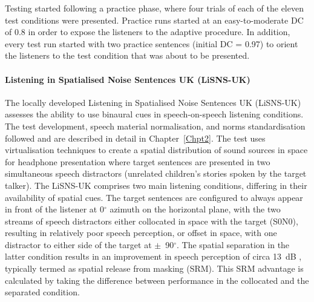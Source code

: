 \documentclass[a4paper, twoside]{templates/ociamthesis}
\begin{document}
Testing started following a practice phase, where four trials of each of the eleven test conditions were presented. Practice runs started at an easy-to-moderate DC of 0.8 in order to expose the listeners to the adaptive procedure. In addition, every test run started with two practice sentences (initial DC = 0.97) to orient the listeners to the test condition that was about to be presented.\\

\hypertarget{listening-in-spatialised-noise-sentences-uk-lisns-uk}{%
\paragraph{Listening in Spatialised Noise Sentences UK (LiSNS-UK)}\label{listening-in-spatialised-noise-sentences-uk-lisns-uk}}

\hfill\break
The locally developed Listening in Spatialised Noise Sentences UK (LiSNS-UK) assesses the ability to use binaural cues in speech-on-speech listening conditions. The test development, speech material normalisation, and norms standardisation followed \textcite{Cameron2007} and are described in detail in Chapter~\ref{Chpt2}. The test uses virtualisation techniques to create a spatial distribution of sound sources in space for headphone presentation where target sentences \autocite[ASL;][]{MacLeod1990} are presented in two simultaneous speech distractors (unrelated children's stories spoken by the target talker). The LiSNS-UK comprises two main listening conditions, differing in their availability of spatial cues. The target sentences are configured to always appear in front of the listener at 0\(^{\circ}\) azimuth on the horizontal plane, with the two streams of speech distractors either collocated in space with the target (S0N0), resulting in relatively poor speech perception, or offset in space, with one distractor to either side of the target at \(\pm\)~90\(^{\circ}\). The spatial separation in the latter condition results in an improvement in speech perception of circa 13~dB \autocite{Cameron2011}, typically termed as spatial release from masking (SRM). This SRM advantage is calculated by taking the difference between performance in the collocated and the separated condition.\\
\end{document}

